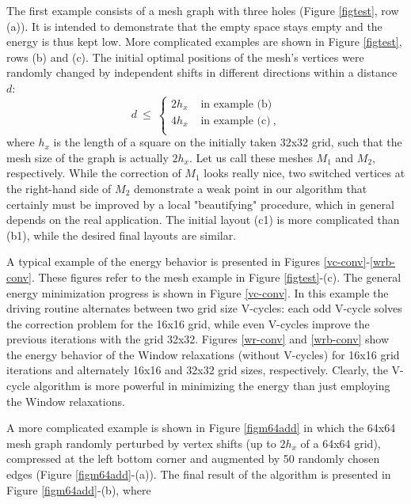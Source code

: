 \documentclass[final]{siamltex}
\begin{document}
\par The first example consists
 of a mesh graph with three holes (Figure \ref{figtest}, row (a)).
 It is intended to demonstrate that the empty space stays empty and
 the energy is thus kept low. More complicated examples are shown
 in Figure \ref{figtest}, rows (b) and (c). The initial optimal positions
 of the mesh's vertices were randomly changed by independent shifts
 in different directions within a distance $d$:
\begin{equation*}
d~\leq~ \left\{
  \begin{array}{ll}
  2h_x & \text{ in example (b)}\\
  4h_x & \text{ in example (c)}~,\\
  \end{array} \right.
\end{equation*}
where $h_x$ is the length of a square on the initially taken 32x32
grid, such that the mesh size of the graph is actually $2h_x$. Let
us call these meshes $M_1$ and $M_2$, respectively. While the
correction of $M_1$ looks really nice, two switched vertices at
the right-hand side of $M_2$ demonstrate a weak point in our
algorithm that certainly must be improved by a local "beautifying"
procedure, which in general depends on the real application. The
initial layout (c1) is more complicated than (b1), while the
desired final layouts are similar.
\par A typical example of the energy behavior is presented
in Figures \ref{vc-conv}-\ref{wrb-conv}. These figures refer to
the mesh example in Figure \ref{figtest}-(c). The general energy
minimization progress is shown in Figure \ref{vc-conv}. In this
example the driving routine alternates between two grid size
V-cycles: each odd V-cycle solves the correction problem for the
16x16 grid, while even V-cycles improve the previous iterations
with the grid 32x32.
Figures \ref{wr-conv} and \ref{wrb-conv} show the
energy behavior of the Window relaxations (without V-cycles) for
16x16 grid iterations and alternately 16x16 and 32x32 grid sizes,
respectively. Clearly, the V-cycle algorithm is more powerful in
minimizing the energy than just employing the Window relaxations.
\par A more complicated example is shown in Figure
\ref{figm64add} in which the 64x64 mesh graph randomly perturbed
by vertex shifts (up to $2h_x$ of a 64x64 grid), compressed at the
left bottom corner and augmented by 50 randomly chosen edges
 (Figure \ref{figm64add}-(a)). The final result of the
 algorithm is presented in Figure  \ref{figm64add}-(b), where
\end{document}
